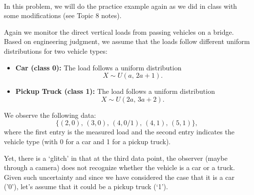 \documentclass[12pt]{article}
\begin{document}
\newpage
\noindent {} \\
In this problem, we will do the practice example again as we did in class with some modifications (see Topic 8 notes).

Again we monitor the direct vertical loads from passing vehicles on a bridge. Based on engineering judgment, we assume that the loads follow different uniform distributions for two vehicle types:

\begin{itemize}
    \item \textbf{Car (class 0):} The load follows a uniform distribution 
    \[
    X \sim U(a,\, 2a+1).
    \]
    \item \textbf{Pickup Truck (class 1):} The load follows a uniform distribution 
    \[
    X \sim U(2a,\, 3a+2).
    \]
\end{itemize}

We observe the following data:
\[
\{(2, 0),\, (3, 0),\, (4, 0/1),\, (4, 1),\, (5, 1)\},
\]
where the first entry is the measured load and the second entry indicates the vehicle type (with 0 for a car and 1 for a pickup truck).

Yet, there is a `glitch' in that at the third data point, the observer (maybe through a camera) does not recognize whether the vehicle is a car or a truck. Given such uncertainty and since we have considered the case that it is a car ('0'), let's assume that it could be a pickup truck (`1').
\end{document}
